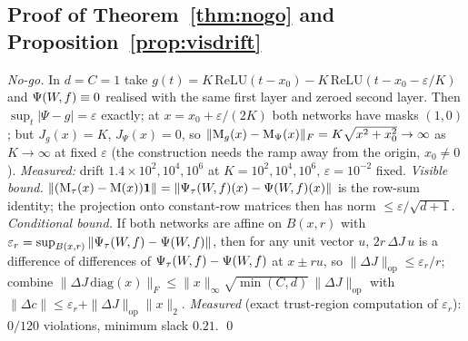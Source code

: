 \subsection{Proof of Theorem~\ref{thm:nogo} and Proposition~\ref{prop:visdrift}}

\emph{No-go.} In $d=C=1$ take
$g(t)=K\,\mathrm{ReLU}(t-x_0)-K\,\mathrm{ReLU}(t-x_0-\varepsilon/K)$ and
$\Psi(W\!,f)\equiv0$ realised with the same first layer and zeroed second layer. Then
$\sup_t|\Psi-g|=\varepsilon$ exactly; at $x=x_0+\varepsilon/(2K)$ both networks
have masks $(1,0)$; but $J_g(x)=K$, $J_\Psi(x)=0$, so
$\|\mathrm{M}_g(x)-\mathrm{M}_\Psi(x)\|_F=K\sqrt{x^2+x_0^2}\to\infty$ as $K\to\infty$ at fixed
$\varepsilon$ (the construction needs the ramp away from the origin,
$x_0\neq0$). \emph{Measured:} drift $1.4\times10^{2},10^{4},10^{6}$ at
$K=10^{2},10^{4},10^{6}$, $\varepsilon=10^{-2}$ fixed.
\emph{Visible bound.} $\|(\mathrm{M}_\tau(x)-\mathrm{M}(x))\mathbf 1\|=\|\Psi_\tau(W\!,f)(x)-\Psi(W\!,f)(x)\|$ is
the row-sum identity; the projection onto constant-row matrices then has norm
$\le\varepsilon/\sqrt{d+1}$. \emph{Conditional bound.} If both networks are
affine on $B(x,r)$ with $\varepsilon_r=\sup_{B(x,r)}\|\Psi_\tau(W\!,f)-\Psi(W\!,f)\|$, then for
any unit vector $u$, $2r\,\Delta J\,u$ is a difference of differences of
$\Psi_\tau(W\!,f)-\Psi(W\!,f)$ at $x\pm ru$, so $\|\Delta J\|_{\mathrm{op}}\le\varepsilon_r/r$;
combine $\|\Delta J\,\mathrm{diag}(x)\|_F\le\|x\|_\infty\sqrt{\min(C,d)}\,
\|\Delta J\|_{\mathrm{op}}$ with
$\|\Delta c\|\le\varepsilon_r+\|\Delta J\|_{\mathrm{op}}\|x\|_2$.
\emph{Measured} (exact trust-region computation of $\varepsilon_r$):
$0/120$ violations, minimum slack $0.21$. \qed
